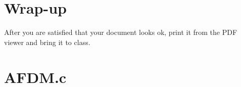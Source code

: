 \section{Wrap-up}

After you are satisfied that your document looks ok, print it from the
PDF viewer and bring it to class.

\newpage
\section{AFDM.c}
\tiny

\normalsize


